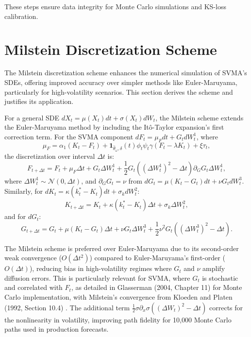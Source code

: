 \documentclass[12pt]{report}
\begin{document}
These steps ensure data integrity for Monte Carlo simulations and KS-loss calibration.

\section{Milstein Discretization Scheme}

The Milstein discretization scheme enhances the numerical simulation of SVMA’s SDEs, offering improved accuracy over simpler methods like Euler-Maruyama, particularly for high-volatility scenarios. This section derives the scheme and justifies its application.

\vspace{0.2in}

For a general SDE \(dX_t = \mu(X_t) dt + \sigma(X_t) dW_t\), the Milstein scheme extends the Euler-Maruyama method by including the Itô-Taylor expansion’s first correction term. For the SVMA component \(dF_t = \mu_F dt + G_t dW_t^1\), where
\[
    \mu_F = \alpha_1 (K_t - F_t) + \mathbf{1}_{\hat{\theta}_\omega, \delta}(t) \phi_t \psi_t \gamma (F_t - \lambda K_t) + \xi \tau_t,
\]
the discretization over interval \(\Delta t\) is:
\[
    F_{t+\Delta t} = F_t + \mu_F \Delta t + G_t \Delta W_t^1 + \frac{1}{2} G_t \left( (\Delta W_t^1)^2 - \Delta t \right) \partial_G G_t \Delta W_t^1,
\]
where \(\Delta W_t^1 \sim \mathcal{N}(0, \Delta t)\), and \(\partial_G G_t = \nu\) from \(dG_t = \mu (K_t - G_t) dt + \nu G_t dW_t^3\). Similarly, for \(dK_t = \kappa (k_t^* - K_t) dt + \sigma_k dW_t^2\):
\[
    K_{t+\Delta t} = K_t + \kappa (k_t^* - K_t) \Delta t + \sigma_k \Delta W_t^2,
\]
and for \(dG_t\):
\[
    G_{t+\Delta t} = G_t + \mu (K_t - G_t) \Delta t + \nu G_t \Delta W_t^3 + \frac{1}{2} \nu^2 G_t \left( (\Delta W_t^3)^2 - \Delta t \right).
\]

The Milstein scheme is preferred over Euler-Maruyama due to its second-order weak convergence (\(O(\Delta t^2)\)) compared to Euler-Maruyama’s first-order (\(O(\Delta t)\)), reducing bias in high-volatility regimes where \(G_t\) and \(\nu\) amplify diffusion errors. This is particularly relevant for SVMA, where \(G_t\) is stochastic and correlated with \(F_t\), as detailed in Glasserman (2004, Chapter 11) \cite{glasserman2004} for Monte Carlo implementation, with Milstein’s convergence from Kloeden and Platen (1992, Section 10.4) \cite{kloeden1992numerical}. The additional term \(\frac{1}{2} \sigma \partial_x \sigma \left( (\Delta W_t)^2 - \Delta t \right)\) corrects for the nonlinearity in volatility, improving path fidelity for 10,000 Monte Carlo paths used in production forecasts.
\end{document}
